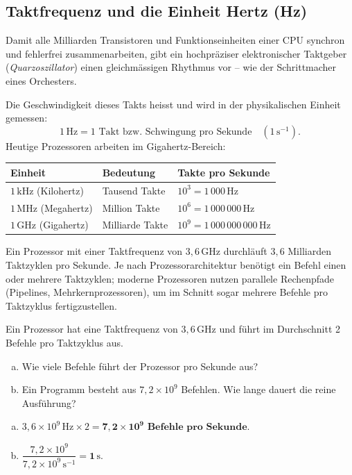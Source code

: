 \subsection{Taktfrequenz und die Einheit Hertz (Hz)}

Damit alle Milliarden Transistoren und Funktionseinheiten einer \gls{CPU} synchron und fehlerfrei zusammenarbeiten, gibt ein hochpräziser elektronischer Taktgeber (\emph{Quarzoszillator}) einen gleichmässigen Rhythmus vor -- wie der Schrittmacher eines Orchesters.

Die Geschwindigkeit dieses Takts heisst  und wird in der physikalischen Einheit  gemessen:
\[
    1\,\mathrm{Hz} = 1\text{ Takt bzw. Schwingung pro Sekunde}\quad (1\,\mathrm{s}^{-1}).
\]
Heutige Prozessoren arbeiten im Gigahertz-Bereich:
\begin{center}
    \begin{tabular}{lll}
        Einheit & Bedeutung & Takte pro Sekunde \\\midrule\midrule
        $1\,\mathrm{kHz}$ (Kilohertz) & Tausend Takte & $10^3 = 1\,000\,\mathrm{Hz}$ \\\midrule
        $1\,\mathrm{MHz}$ (Megahertz) & Million Takte & $10^6 = 1\,000\,000\,\mathrm{Hz}$ \\\midrule
        $1\,\mathrm{GHz}$ (Gigahertz) & Milliarde Takte & $10^9 = 1\,000\,000\,000\,\mathrm{Hz}$ \\
    \end{tabular}
\end{center}
Ein Prozessor mit einer Taktfrequenz von $3{,}6\,\mathrm{GHz}$ durchläuft $3{,}6$ Milliarden Taktzyklen pro Sekunde. Je nach Prozessorarchitektur benötigt ein Befehl einen oder mehrere Taktzyklen; moderne Prozessoren nutzen parallele Rechenpfade (Pipelines, Mehrkernprozessoren), um im Schnitt sogar mehrere Befehle pro Taktzyklus fertigzustellen.

\begin{myexercise}\label{myexercise:taktfrequenz}
    Ein Prozessor hat eine Taktfrequenz von $3{,}6\,\mathrm{GHz}$ und führt im Durchschnitt 2 Befehle pro Taktzyklus aus.
    \begin{enumerate}[(a)]
        \item Wie viele Befehle führt der Prozessor pro Sekunde aus?
        \item Ein Programm besteht aus $7{,}2 \times 10^9$ Befehlen. Wie lange dauert die reine Ausführung?
    \end{enumerate}
    \begin{myanswer}
        \begin{enumerate}[(a)]
            \item $3{,}6 \times 10^9 \,\mathrm{Hz} \times 2 = \mathbf{7{,}2 \times 10^9\text{ Befehle pro Sekunde}}$.
            \item $\dfrac{7{,}2 \times 10^9}{7{,}2 \times 10^9\,\mathrm{s}^{-1}} = \mathbf{1\,\mathrm{s}}$.
        \end{enumerate}
    \end{myanswer}
\end{myexercise}

